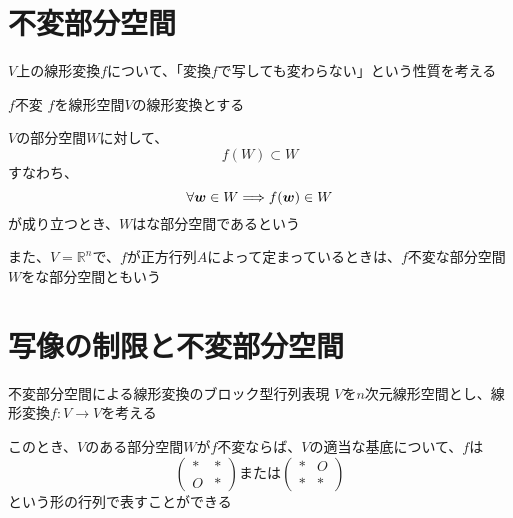 \documentclass[../../../topic_linear-algebra]{subfiles}
\begin{document}
\sectionline
\section{不変部分空間}

$V$上の線形変換$f$について、「変換$f$で写しても変わらない」という性質を考える

\begin{definition}{$f$不変}
  $f$を線形空間$V$の線形変換とする

  $V$の部分空間$W$に対して、
  \begin{equation*}
    f(W) \subset W
  \end{equation*}
  すなわち、
  \begin{equation*}
    \forall\vb*{w} \in W \Longrightarrow f(\vb*{w}) \in W
  \end{equation*}
  が成り立つとき、$W$はな部分空間であるという

  \br

  また、$V=\mathbb{R}^n$で、$f$が正方行列$A$によって定まっているときは、$f$不変な部分空間$W$をな部分空間ともいう
\end{definition}

\sectionline
\section{写像の制限と不変部分空間}

\begin{theorem}{不変部分空間による線形変換のブロック型行列表現}\label{thm:block-matrix-by-invariant-subspace}
  $V$を$n$次元線形空間とし、線形変換$f\colon V \to V$を考える

  このとき、$V$のある部分空間$W$が$f$不変ならば、$V$の適当な基底について、$f$は
  \begin{equation*}
    \begin{pmatrix}
      * & * \\
      O & *
    \end{pmatrix} \text{または}
    \begin{pmatrix}
      * & O \\
      * & *
    \end{pmatrix}
  \end{equation*}
  という形の行列で表すことができる
\end{theorem}
\end{document}
